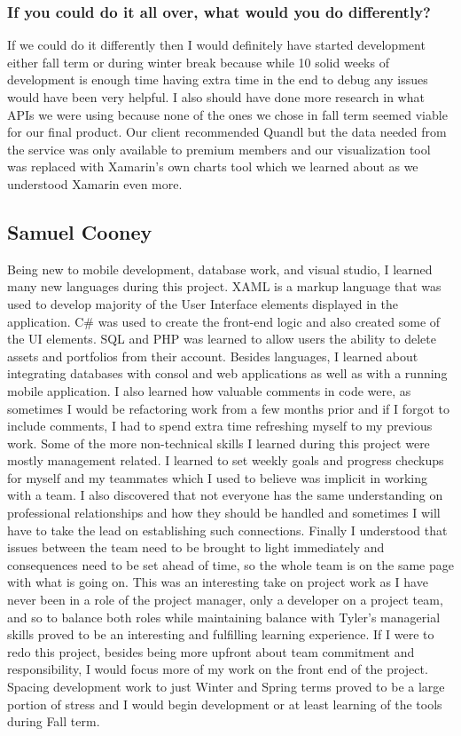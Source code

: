 \documentclass[onecolumn, draftclsnofoot,10pt, compsoc]{IEEEtran}
\begin{document}
\subsubsection{If you could do it all over, what would you do differently?}
If we could do it differently then I would definitely have started development either fall term or during winter break because while 10 solid weeks of development is enough time having extra time in the end to debug any issues would have been very helpful. I also should have done more research in what APIs we were using because none of the ones we chose in fall term seemed viable for our final product. Our client recommended Quandl but the data needed from the service was only available to premium members and our visualization tool was replaced with Xamarin’s own charts tool which we learned about as we understood Xamarin even more. 

\subsection{Samuel Cooney}
Being new to mobile development, database work, and visual studio, I learned many new languages during this project. XAML is a markup language that was used to develop majority of the User Interface elements
displayed in  the application. C\# was used to create the front-end logic and also created some of the UI elements. SQL and PHP was learned to allow users the ability to delete assets and portfolios from their
account. Besides languages, I learned about integrating databases with consol and web applications as well as with a running mobile application.
I also learned how valuable comments in code were, as sometimes I would be refactoring work from a few months prior and if I forgot to include comments, I had to spend extra time refreshing myself to my previous work. 
Some of the more non-technical skills I learned during this project were mostly management related. I learned to set weekly goals and progress checkups for myself and my teammates which I used to 
believe was implicit in working with a team. I also discovered that not everyone has the same understanding on professional relationships and how they should be handled and sometimes
I will have to take the lead on establishing such connections. Finally I understood that issues between the team need to be brought to light immediately 
and consequences need to be set ahead of time, so the whole team is on  the same page with what is going on. This was an interesting take on project work as
I have never been in a role of the project manager, only a developer on a project team, and so to balance both roles while maintaining balance with Tyler's managerial skills
proved to be an interesting and fulfilling learning experience. If I were to redo this project, besides being more upfront about team commitment and responsibility, I would
focus more of my work on the front end of the project. Spacing development work to just Winter and Spring terms proved to be a large portion of stress and I would begin development
or at least learning of the tools during Fall term.
\end{document}
